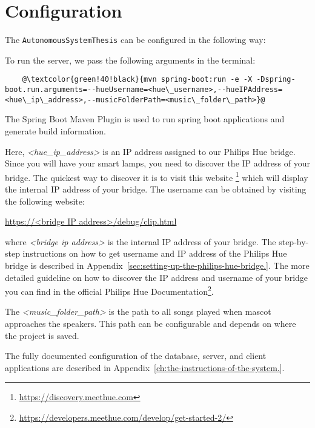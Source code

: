 \section{Configuration}
\label{sec:configuration}
The \texttt{AutonomousSystemThesis} can be configured in the following way:

To run the server, we pass the following arguments in the terminal:
\begin{lstlisting}
    @\textcolor{green!40!black}{mvn spring-boot:run -e -X -Dspring-boot.run.arguments=--hueUsername=<hue\_username>,--hueIPAddress=<hue\_ip\_address>,--musicFolderPath=<music\_folder\_path>}@
\end{lstlisting}

The Spring Boot Maven Plugin is used to run spring boot applications and generate build information.

Here, \emph{<hue\_ip\_address>} is an IP address assigned to our Philips Hue bridge.
Since you will have your smart lamps, you need to discover the IP address of your bridge.
The quickest way to discover it is to visit this website \footnote{\url{https://discovery.meethue.com}} which
will display the internal IP address of your bridge.
The username can be obtained by visiting the following website:

\url{https://<bridge IP address>/debug/clip.html}

where \emph{<bridge ip address>} is the internal IP address of your bridge.
The step-by-step instructions on how to get username and IP address of the Philips Hue bridge is described in
Appendix~\ref{sec:setting-up-the-philips-hue-bridge.}.
The more detailed guideline on how to discover the IP address and username of your bridge you can
find in the official Philips Hue Documentation\footnote{\url{https://developers.meethue.com/develop/get-started-2/}}.

The \emph{<music\_folder\_path>} is the path to all songs played when mascot approaches the speakers.
This path can be configurable and depends on where the project is saved.

The fully documented configuration of the database, server, and client applications are described in
Appendix~\ref{ch:the-instructions-of-the-system.}.

